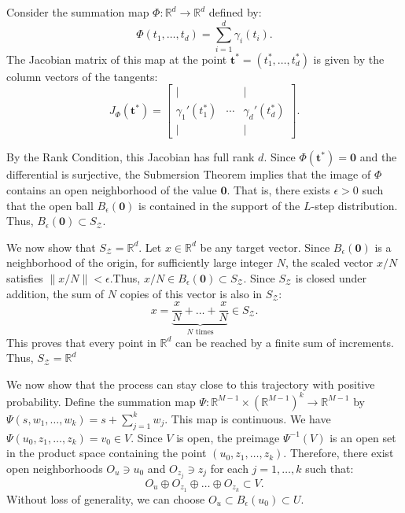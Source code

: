 \documentclass[12pt]{article}
\begin{document}
Consider the summation map $\Phi: \mathbb{R}^d \to \mathbb{R}^d$ defined by:
\[
    \Phi(t_1, \dots, t_d) = \sum_{i=1}^d \gamma_i(t_i).
\]
The Jacobian matrix of this map at the point $\mathbf{t}^* = (t_1^*, \dots, t_d^*)$ is given by the column vectors of the tangents:
\[
    J_\Phi(\mathbf{t}^*) = \begin{bmatrix} | & & | \\ \gamma_1'(t_1^*) & \cdots & \gamma_d'(t_d^*) \\ | & & | \end{bmatrix}.
\]

By the Rank Condition, this Jacobian has full rank $d$. Since $\Phi(\mathbf{t}^*) = \mathbf{0}$ and the differential is surjective, the Submersion Theorem implies that the image of $\Phi$ contains an open neighborhood of the value $\mathbf{0}$. That is, there exists $\epsilon > 0$ such that the open ball $B_\epsilon(\mathbf{0})$ is contained in the support of the $L$-step distribution. Thus, $B_\epsilon(\mathbf{0}) \subset S_{\mathcal{Z}}$. 

We now show that $S_{\mathcal{Z}} = \mathbb{R}^d$. Let $x \in \mathbb{R}^d$ be any target vector. Since $B_\epsilon(\mathbf{0})$ is a neighborhood of the origin, for sufficiently large integer $N$, the scaled vector $x/N$ satisfies $\| x/N \| < \epsilon$.Thus, $x/N \in B_\epsilon(\mathbf{0}) \subset S_{\mathcal{Z}}$. Since $S_{\mathcal{Z}}$ is closed under addition, the sum of $N$ copies of this vector is also in $S_{\mathcal{Z}}$:\[ x = \underbrace{\frac{x}{N} + \dots + \frac{x}{N}}_{N \text{ times}} \in S_{\mathcal{Z}}. \] This proves that every point in $\mathbb{R}^d$ can be reached by a finite sum of increments. Thus, $S_{\mathcal{Z}} = \mathbb{R}^d$

We now show that the process can stay close to this trajectory with positive probability. Define the summation map $\Psi: \mathbb{R}^{M-1} \times (\mathbb{R}^{M-1})^k \to \mathbb{R}^{M-1}$ by $\Psi(s, w_1, \dots, w_k) = s + \sum_{j=1}^k w_j$. This map is continuous. We have $\Psi(u_0, z_1, \dots, z_k) = v_0 \in V$. Since $V$ is open, the preimage $\Psi^{-1}(V)$ is an open set in the product space containing the point $(u_0, z_1, \dots, z_k)$. Therefore, there exist open neighborhoods $O_{u} \ni u_0$ and $O_{z_j} \ni z_j$ for each $j=1,\dots,k$ such that:
\[
    O_{u} \oplus O_{z_1} \oplus \dots \oplus O_{z_k} \subset V.
\]
Without loss of generality, we can choose $O_u \subset B_\epsilon(u_0) \subset U$.
\end{document}
